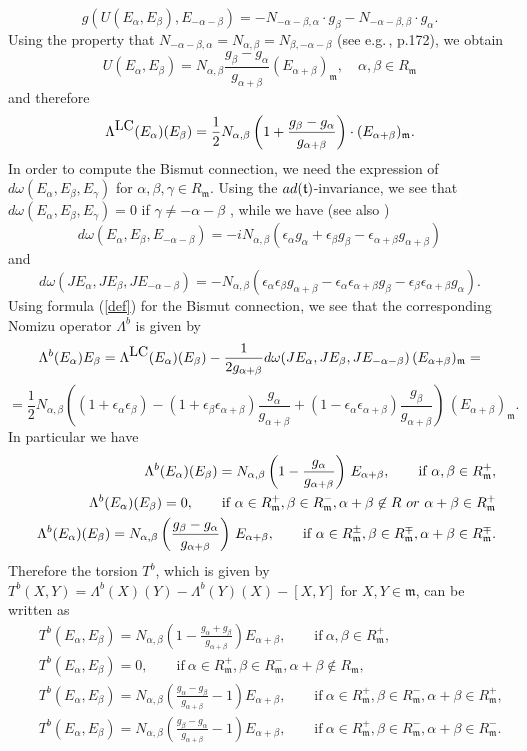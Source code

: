 \documentclass{amsart}
\numberwithin{equation}{section}
\theoremstyle{definition}
\renewcommand{\1}{\mathds{1}}
\renewcommand{\a}{\alpha}
\renewcommand{\b}{\beta}
\newcommand{\g}{\gamma}
\newcommand{\gm}{\mathfrak m}
\newcommand{\gt}{\mathfrak t}
\newcommand{\ad}{\rm {ad}}
\newcommand{\ep}{\epsilon}
\renewcommand{\>}{\rightarrow}
\begin{document}
$$g(U(E_\a,E_\b),E_{-\a-\b}) = -N_{-\a-\b,\a}\cdot g_\b - N_{-\a-\b,\b}\cdot g_\a.$$
Using the property that $N_{-\a-\b,\a}=N_{\a,\b} = N_{\b,-\a-\b}$ (see e.g.\,\cite{He}, p.172), we obtain
$$U(E_\a,E_\b) = N_{\a,\b} \frac{g_\b - g_\a}{g_{\a+\b}}(E_{\a+\b})_\gm,\quad \a,\b \in R_\gm$$
and therefore
\begin{equation}\label{LambdaLC}\Lambda^{\mbox{\tiny LC}}(E_\a)(E_\b) = \frac 12 N_{\a,\b}\left( 1 + \frac{g_\b-g_\a}{g_{\a+\b}}\right)\cdot (E_{\a+\b})_\gm.\end{equation}
In order to compute the Bismut connection, we need the expression of $d\omega(E_\a,E_\b,E_\g)$ for $\a,\b,\g\in R_\gm$. Using the $\ad(\gt)$-invariance, we see that $d\omega(E_\a,E_\b,E_\g)=0$ if $\g\neq -\a-\b$ , while we have (see also \cite{AD})
$$d\omega(E_\a,E_\b,E_{-\a-\b}) = -i N_{\a,\b}\left(\epsilon_\a g_\a + \epsilon_\b g_\b - \epsilon_{\a+\b}g_{\a+\b}\right)  $$
and
$$d\omega(JE_\a,JE_\b,JE_{-\a-\b}) = - N_{\a,\b}\left(\epsilon_\a \epsilon_\b g_{\a+\b} - \epsilon_\a \epsilon_{\a+\b}g_\b - \epsilon_\b\epsilon_{\a+\b}g_{\a}\right).  $$
Using formula (\ref{def}) for the Bismut connection, we see that the corresponding Nomizu operator $\Lambda^b$ is given by
$$\Lambda^b(E_\a)E_\b = \Lambda^{\mbox{\tiny LC}}(E_\a)(E_\b) -\frac 1{2g_{\a+\b}}d\omega(JE_\a,JE_\b,JE_{-\a-\b})\, (E_{\a+\b})_\gm=$$
$$= \frac 12 N_{\a,\b}\left( (1+\ep_\a\ep_\b) - (1+\ep_\b\ep_{\a+\b})\frac{g_\a}{g_{\a+\b}} + (1-\ep_\a\ep_{\a+\b})\frac{g_\b}{g_{\a+\b}}\right) \, (E_{\a+\b})_\gm.$$
In particular we have
\begin{eqnarray}\label{conn}
&& \Lambda^b(E_\a)(E_\b)= N_{\a,\b}\left(1-\frac{g_\a}{g_{\a+\b}}\right) \, E_
{\a+\b},\qquad \mbox{if}\ \a,\b\in R_\gm^+,\\
&& \Lambda^b(E_\a)(E_\b)= 0, \qquad \mbox{if}\ \a\in R_\gm^+, \b\in R_\gm^-, \a+\b\not\in R\ {\rm{or}}\ \a+\b\in R_\gm^+\\
&& \Lambda^b(E_\a)(E_\b)= N_{\a,\b}\left(\frac{g_\b-g_\a}{g_{\a+\b}}\right) \, E_
{\a+\b},\qquad \mbox{if}\ \a\in R_\gm^{\pm},\b\in R_\gm^{\mp}, \a+\b \in R_\gm^{\mp}.
\end{eqnarray}
Therefore the torsion $T^b$, which is given by $T^b(X,Y) = \Lambda^b(X)(Y)-\Lambda^b(Y)(X) - [X,Y]$ for $X,Y\in \gm$, can be written as
\begin{eqnarray}
&& T^b(E_\a,E_\b) = N_{\a,\b}\left( 1 - \frac{g_\a + g_\b}{g_{\a+\b}}\right) E_{\a+\b},\qquad \mbox{if}\ \a,\b\in R_\gm^+,\\
&& T^b(E_\a,E_\b) = 0, \qquad \mbox{if}\ \a\in R_\gm^+,\b\in R_\gm^-, \a+\b\not\in R_\gm,\\
&& T^b(E_\a,E_\b) = N_{\a,\b}\left( \frac{g_\a - g_\b}{g_{\a+\b}}-1\right) E_{\a+\b},\qquad \mbox{if}\ \a\in R_\gm^+,\b\in R_\gm^-, \a+\b\in R_\gm^+,\\
&& T^b(E_\a,E_\b) = N_{\a,\b}\left( \frac{g_\b - g_\a}{g_{\a+\b}}-1\right) E_{\a+\b},\qquad \mbox{if}\ \a\in R_\gm^+,\b\in R_\gm^-, \a+\b\in R_\gm^-.
\end{eqnarray}
\end{document}
